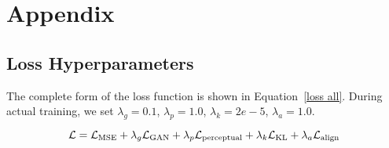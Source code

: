 \newpage
\appendix
\onecolumn
\section*{Appendix}

\subsection*{Loss Hyperparameters}

The complete form of the loss function is shown in Equation~\ref{loss all}. During actual training, we set $\lambda_g=0.1$, $\lambda_p=1.0$, $\lambda_{k}=2e-5$, $\lambda_{a}=1.0$.

\begin{equation}
{\mathcal{L}} = {\mathcal{L}}_{\text{MSE}} + \lambda_g {\mathcal{L}}_{\text{GAN}} + \lambda_p {\mathcal{L}}_{\text{perceptual}} + \lambda_{k} {\mathcal{L}}_{\text{KL}} + \lambda_{a} {\mathcal{L}}_{\text{align}}
\label{loss all}
\end{equation}




